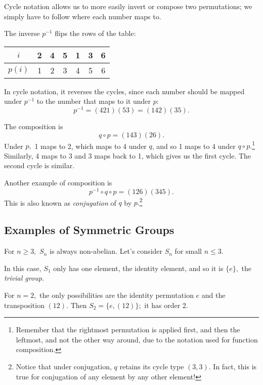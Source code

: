 Cycle notation allows us to more easily invert or compose two permutations; we simply have to follow where each number maps to. 

\begin{example}[Inversion]
The inverse $p^{-1}$ flips the rows of the table:
\begin{center}
    \begin{tabular}{c|c c c c c c}
     $i$ & 2 & 4 & 5 & 1 & 3 & 6 \\
     \hline 
     $p(i)$ & 1 & 2 & 3 & 4 & 5 & 6 
\end{tabular}
\end{center}

In cycle notation, it reverses the cycles, since each number should be mapped under $p^{-1}$ to the number that maps to it under $p$:
\[
p^{-1} = (421)(53) = (142)(35).
\]
\end{example}

\begin{example}[Composition]
The composition is
\[
q \circ p = (143)(26).
\]
Under $p,$ 1 maps to 2, which maps to 4 under $q$, and so 1 maps to 4 under $q \circ p.$\footnote{Remember that the rightmost permutation is applied first, and then the leftmost, and not the other way around, due to the notation used for function composition.} Similarly, 4 maps to 3 and 3 maps back to 1, which gives us the first cycle. The second cycle is similar.  
\end{example}

\begin{example}[Conjugation]
Another example of composition is
\[
p^{-1} \circ q \circ p = (126)(345).
\]
This is also known as \emph{conjugation} of $q$ by $p.$\footnote{Notice that under conjugation, $q$ retains its cycle type $(3, 3).$ In fact, this is true for conjugation of any element by any other element!}
\end{example}

\subsection{Examples of Symmetric Groups}
For $n \geq 3,$ $S_n$ is always non-abelian. Let's consider $S_n$ for small $n \leq 3.$
\begin{example}[$S_1$]
In this case, $S_1$ only has one element, the identity element, and so it is $\{e\},$ the \emph{trivial group.}
\end{example}

\begin{example}[$S_2$]
For $n = 2,$ the only possibilities are the identity permutation $e$ and the transposition $(12).$ Then $S_2 = \{e, (12)\};$ it has order 2.
\end{example}

